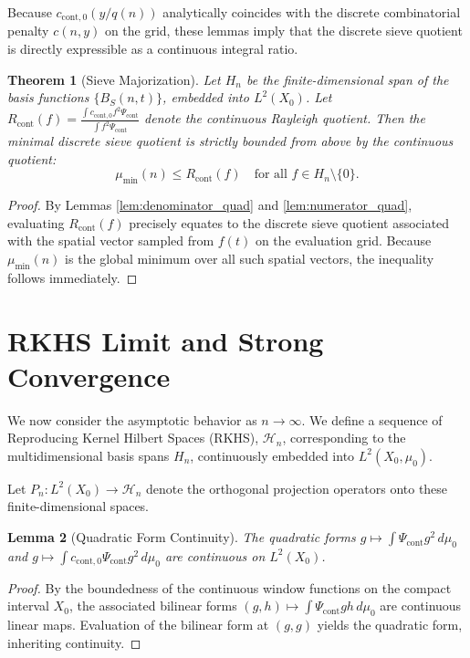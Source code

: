 \documentclass{aomart}
\newtheorem{theorem}{Theorem}[section]
\newtheorem{lemma}[theorem]{Lemma}
\theoremstyle{definition}
\begin{document}
Because $c_{\text{cont}, 0}(y/q(n))$ analytically coincides with the discrete combinatorial penalty
$c(n, y)$ on the grid, these lemmas imply that the discrete sieve quotient is directly expressible
as a continuous integral ratio.

\begin{theorem}[Sieve Majorization] \label{thm:majorization}
Let $H_n$ be the finite-dimensional span of the basis functions $\{B_S(n, t)\}$, embedded into
$L^2(X_0)$. Let $R_{\text{cont}}(f) = \frac{\int c_{\text{cont}, 0} f^2 \Psi_{\text{cont}}}{\int f^2 \Psi_{\text{cont}}}$
denote the continuous Rayleigh quotient. Then the minimal discrete sieve quotient is strictly
bounded from above by the continuous quotient:
\[ \mu_{\min}(n) \le R_{\text{cont}}(f) \quad \text{for all } f \in H_n \setminus \{0\}. \]
\end{theorem}
\begin{proof}
By Lemmas \ref{lem:denominator_quad} and \ref{lem:numerator_quad}, evaluating $R_{\text{cont}}(f)$
precisely equates to the discrete sieve quotient associated with the spatial vector sampled from
$f(t)$ on the evaluation grid. Because $\mu_{\min}(n)$ is the global minimum over all such spatial
vectors, the inequality follows immediately.
\end{proof}

\section{RKHS Limit and Strong Convergence} \label{sec:rkhs}

We now consider the asymptotic behavior as $n \to \infty$. We define a sequence of Reproducing
Kernel Hilbert Spaces (RKHS), $\mathcal{H}_n$, corresponding to the multidimensional basis spans
$H_n$, continuously embedded into $L^2(X_0, \mu_0)$.

Let $P_n : L^2(X_0) \to \mathcal{H}_n$ denote the orthogonal projection operators onto these
finite-dimensional spaces.

\begin{lemma}[Quadratic Form Continuity]
The quadratic forms $g \mapsto \int \Psi_{\text{cont}} g^2 \, d\mu_0$ and $g \mapsto \int
c_{\text{cont},0} \Psi_{\text{cont}} g^2 \, d\mu_0$ are continuous on $L^2(X_0)$.
\end{lemma}
\begin{proof}
By the boundedness of the continuous window functions on the compact interval $X_0$, the
associated bilinear forms $(g, h) \mapsto \int \Psi_{\text{cont}} g h \, d\mu_0$ are
continuous linear maps. Evaluation of the bilinear form at $(g,g)$ yields the quadratic form,
inheriting continuity.
\end{proof}
\end{document}
